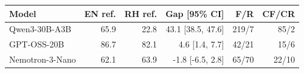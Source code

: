 \begin{tabular}{lrrrrr}
\toprule
Model & EN ref. & RH ref. & Gap [95\% CI] & F/R & CF/CR \\
\midrule
Qwen3-30B-A3B & 65.9 & 22.8 & 43.1 [38.5, 47.6] & 219/7 & 85/2 \\
GPT-OSS-20B & 86.7 & 82.1 & 4.6 [1.4, 7.7] & 42/21 & 15/6 \\
Nemotron-3-Nano & 62.1 & 63.9 & -1.8 [-6.5, 2.8] & 65/70 & 22/10 \\
\bottomrule
\end{tabular}
